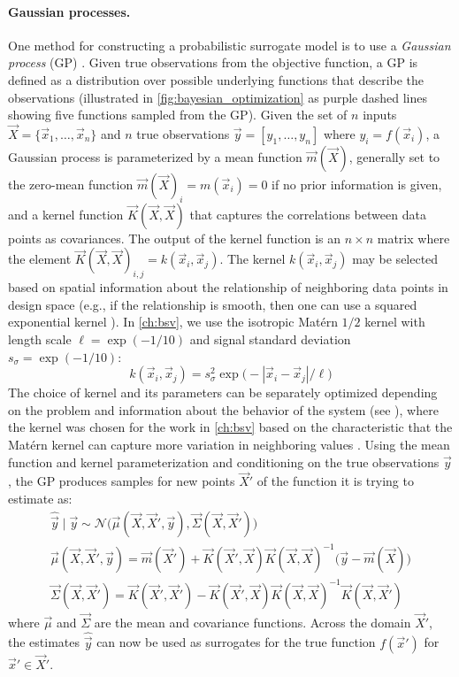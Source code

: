 \paragraph{Gaussian processes.}
One method for constructing a probabilistic surrogate model is to use a \textit{Gaussian process} (GP) \cite{williams2006gaussian}. Given true observations from the objective function, a GP is defined as a distribution over possible underlying functions that describe the observations \cite{optbook} (illustrated in \cref{fig:bayesian_optimization} as purple dashed lines showing five functions sampled from the GP). 
Given the set of $n$ inputs $\vec{X}=\{\vec{x}_1, \ldots, \vec{x}_n\}$ and $n$ true observations $\vec{y} = [y_1, \ldots, y_n]$ where $y_i = f(\vec{x}_i)$, a Gaussian process is parameterized by a mean function $\vec{m}(\vec{X})$, generally set to the zero-mean function $\vec{m}(\vec{X})_i = m(\vec{x}_i)=0$ if no prior information is given, and a kernel function $\vec{K}(\vec{X},\vec{X})$ that captures the correlations between data points as covariances.
The output of the kernel function is an $n \times n$ matrix where the element $\vec{K}(\vec{X},\vec{X})_{i,j} = k(\vec{x}_i, \vec{x}_j)$. The kernel $k(\vec{x}_i, \vec{x}_j)$ may be selected based on spatial information about the relationship of neighboring data points in design space (e.g., if the relationship is smooth, then one can use a squared exponential kernel \cite{optbook}). In \cref{ch:bsv}, we use the isotropic Mat\'ern $1/2$ kernel \cite{marc2002matern} with length scale $\ell=\exp(-1/10)$ and signal standard deviation $s_\sigma = \exp(-1/10)$:
\begin{equation}
    k(\vec{x}_i, \vec{x}_j) = s_{\sigma}^2 \exp\Big(\!-|\vec{x}_i - \vec{x}_j| / \ell\Big)
\end{equation}
The choice of kernel and its parameters can be separately optimized depending on the problem and information about the behavior of the system (see \textcite{williams2006gaussian}), where the kernel was chosen for the work in \cref{ch:bsv} based on the characteristic that the Mat\'ern kernel can capture more variation in neighboring values \cite{williams2006gaussian}.
Using the mean function and kernel parameterization and conditioning on the true observations $\vec{y}$, the GP produces samples for new points $\vec{X}'$ of the function it is trying to estimate as:
\begin{gather}
    \hat{\vec{y}} \mid \vec{y} \sim \mathcal{N}\big(\vec{\mu}(\vec{X},\vec{X}',\vec{y}), \vec{\Sigma}(\vec{X},\vec{X}')\big) \\
    \vec{\mu}(\vec{X},\vec{X}',\vec{y}) = \vec{m}(\vec{X}') + \vec{K}(\vec{X}', \vec{X})\vec{K}(\vec{X},\vec{X})^{-1}\big(\vec{y} - \vec{m}(\vec{X})\big)\\
    \vec{\Sigma}(\vec{X},\vec{X}') = \vec{K}(\vec{X}', \vec{X}') - \vec{K}(\vec{X}', \vec{X})\vec{K}(\vec{X},\vec{X})^{-1}\vec{K}(\vec{X}, \vec{X}')
\end{gather}
where $\vec{\mu}$ and $\vec{\Sigma}$ are the mean and covariance functions.
Across the domain $\vec{X}'$, the estimates $\hat{\vec{y}}$ can now be used as surrogates for the true function $f(\vec{x}')$ for $\vec{x}' \in \vec{X}'$.


